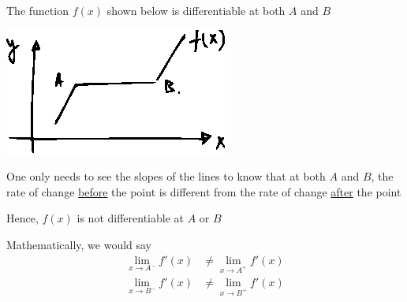 \documentclass[14pt,fleqn]{extarticle}
\begin{document}
 
\begin{snippet}
    
    \incorrect
    
    The function $f(x)$ shown below is differentiable at both $A$ and $B$ 
    
    \begin{center}
\includegraphics[scale=1.5]{figure.eps}
\end{center}
    
    \reason
    
    One only needs to see the slopes of the lines to know that at both $A$ and $B$, the rate of change \underline{before} the point 
    is different from the rate of change \underline{after} the point\newline 
    
    Hence, $f(x)$ is not differentiable at $A$ or $B$ \newline 
    
    Mathematically, we would say 
    \begin{align}
	\lim_{x\to A^-} f'(x) &\neq \lim_{x\to A^+} f'(x) \\
	\lim_{x\to B^-} f'(x) &\neq \lim_{x\to B^+} f'(x) 
\end{align}
\end{snippet} 
\end{document}
